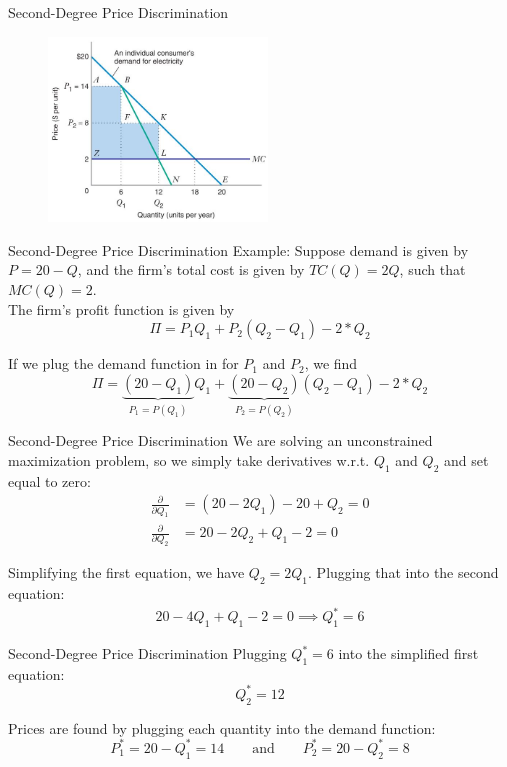 \documentclass[11pt,t]{beamer}
\begin{document}
\begin{frame}{Second-Degree Price Discrimination}
  \begin{figure}
    \includegraphics[width=220px]{figures/fig12_5.jpg}
  \end{figure}
\end{frame}

\begin{frame}{Second-Degree Price Discrimination}
  Example: Suppose demand is given by $P = 20 - Q$, and the firm's total cost is given by $TC(Q)=2Q$, such that $MC(Q)=2$.\\

  The firm's profit function is given by
  $$
    \Pi = P_1 Q_1 + P_2 (Q_2 - Q_1) - 2 * Q_2
  $$

  If we plug the demand function in for $P_1$ and $P_2$, we find
  $$
    \Pi = \underbrace{(20 - Q_1)}_{P_1 = P(Q_1)} Q_1 + \underbrace{(20 - Q_2)}_{P_2 = P(Q_2)} (Q_2 - Q_1) - 2 * Q_2
  $$
\end{frame}

\begin{frame}{Second-Degree Price Discrimination}
  We are solving an unconstrained maximization problem, so we simply take derivatives w.r.t. $Q_1$ and $Q_2$ and set equal to zero:
  \begin{align*}
    \frac{\partial}{\partial Q_1} & = (20 - 2Q_1) - 20 + Q_2 = 0 \\
    \frac{\partial}{\partial Q_2} & = 20 - 2Q_2 + Q_1 - 2 = 0
  \end{align*}

  \pause
  Simplifying the first equation, we have $Q_2 = 2 Q_1$. Plugging that into the second equation:
  \begin{align*}
    20 - 4Q_1 + Q_1 - 2 = 0 \implies Q_1^* = 6
  \end{align*}
\end{frame}

\begin{frame}{Second-Degree Price Discrimination}
  Plugging $Q_1^* = 6$ into the simplified first equation:
  $$
    Q_2^* = 12
  $$

  \bigskip
  Prices are found by plugging each quantity into the demand function:
  $$
    P_1^* = 20 - Q_1^* = 14 \qquad \text{and} \qquad P_2^* = 20 - Q_2^* = 8
  $$
\end{frame}
\end{document}
